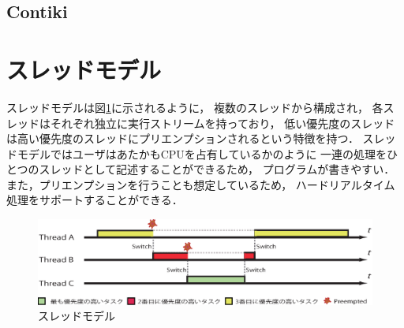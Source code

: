 
\subsection{Contiki}




\section{スレッドモデル}
スレッドモデルは図\ref{fig:threads_model}に示されるように，
複数のスレッドから構成され，
各スレッドはそれぞれ独立に実行ストリームを持っており，
低い優先度のスレッドは高い優先度のスレッドにプリエンプションされるという特徴を持つ．
スレッドモデルではユーザはあたかもCPUを占有しているかのように
一連の処理をひとつのスレッドとして記述することができるため，
プログラムが書きやすい．
また，プリエンプションを行うことも想定しているため，
ハードリアルタイム処理をサポートすることができる．
\begin{figure}[htbp]
 \begin{center}
  \includegraphics[width=140mm]{./images/threads_model.eps}
 \end{center}
 \caption{スレッドモデル}
 \label{fig:threads_model}
\end{figure}


